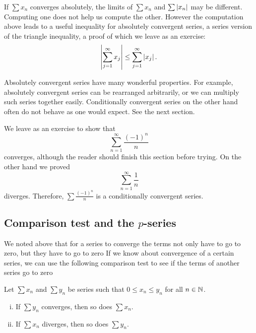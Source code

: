 If $\sum x_n$ converges absolutely, the limits of
$\sum x_n$ and $\sum \left\lvert {x_n} \right\rvert$ may be different.  Computing one
does not help us compute the other.  However the computation above leads to
a useful inequality for absolutely convergent series,
a series version of the triangle inequality,
a proof of which we leave as an exercise:
\begin{equation*}
\left\lvert { \sum_{j=1}^\infty x_j } \right\rvert
\leq
\sum_{j=1}^\infty \left\lvert {x_j} \right\rvert .
\end{equation*}

Absolutely convergent series have many wonderful properties.
For example, absolutely convergent
series can be rearranged arbitrarily, or we can multiply such
series together easily.  Conditionally convergent series on the other hand
often do not behave as one would expect.  See the next section.

We leave as an exercise to show that
\begin{equation*}
\sum_{n=1}^\infty \frac{{(-1)}^n}{n}
\end{equation*}
converges, although the reader should finish this section before trying.
On the other hand we proved
\begin{equation*}
\sum_{n=1}^\infty \frac{1}{n}
\end{equation*}
diverges.  Therefore,
$\sum \frac{{(-1)}^n}{n}$ is a conditionally convergent series.

\subsection{Comparison test and the \texorpdfstring{$p$}{p}-series}

We noted above that for a series to converge
the terms not only have to go to zero, but they have to go to zero
  If we know about convergence of a certain series,
we can use the following comparison test to see if the terms of another
series go to zero 

\begin{samepage}
\begin{prop}
Let $\sum x_n$ and $\sum y_n$ be series such that $0 \leq x_n \leq y_n$
for all $n \in {\mathbb{N}}$.
\begin{enumerate}[(i)]
\item If $\sum y_n$ converges, then so does $\sum x_n$.
\item If $\sum x_n$ diverges, then so does $\sum y_n$.
\end{enumerate}
\end{prop}
\end{samepage}

